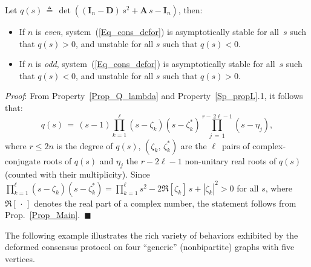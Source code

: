 \documentclass[letterpaper,9pt,twocolumn]{autart}
\newcommand{\vet}[1]{\ensuremath{{\mathbf #1}}}
\begin{document}
\begin{proposition}\label{Prop_stab_gen} Let $q(s) \,\triangleq\, \det((\vet{I}_n - \vet{D})\,s^2 + \vet{A}\,s - \vet{I}_n)$,
then:
\begin{itemize}
\item If $n$ is \emph{even}, system~(\ref{Eq_cons_defor}) is
  asymptotically stable for all~$s$ such that $q(s) > 0$, and unstable for all $s$ such that $q(s) < 0$.
\item If $n$ is \emph{odd}, system~(\ref{Eq_cons_defor}) is
  asymptotically stable for all~$s$ 
such that $q(s) < 0$, and unstable for all $s$ such that $q(s) > 0$.
\end{itemize}
\vspace{-0.1cm}
\emph{Proof}:
From Property~\ref{Prop_Q_lambda} and Property~\ref{Sp_propL}.1, 
it follows that:\vspace{-0.07cm} $$
q(s) \,=\, (s - 1)\prod_{k=1}^{\ell} (s - \zeta_k)(s - \zeta_k^*)\prod_{j\,=\,1}^{r -\, 2\ell -1} (s - \eta_j),
$$
where $r \leq 2n$ is the degree of $q(s)$, $(\zeta_k,\, \zeta_k^*)$
are the $\ell$~pairs of complex-conjugate roots of $q(s)$ and $\eta_j$ the $r - 2\ell - 1$ non-unitary real
roots of $q(s)$ (counted with their multiplicity). Since $\prod_{k=1}^{\ell} (s - \zeta_k)(s
- \zeta_k^*) = \prod_{k=1}^{\ell} s^2 - 2 \Re[\zeta_k]\,s + |\zeta_k|^2 > 0$ for all $s$,
where $\Re[\,\cdot\,]$ denotes the real part of a complex number,
the statement follows from Prop.~\ref{Prop_Main}.~\hfill$\blacksquare$
\end{proposition}
The following example illustrates the rich variety of behaviors exhibited by the deformed consensus protocol
on four ``generic'' (nonbipartite) graphs with five vertices.
\end{document}
